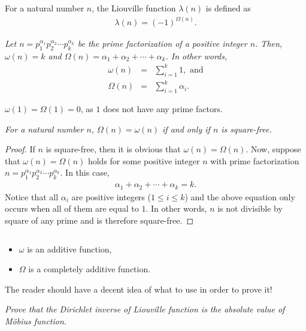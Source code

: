 \documentclass[12pt]{subfile}
\begin{document}
	\begin{definition}
		For a natural number $n$, the Liouville function $\lambda (n)$ is defined as
		\begin{align*}
			\lambda (n) =  (-1)^{\Omega(n)}.
		\end{align*}
	\end{definition}

		\begin{proposition}\slshape
			Let $n= p_1^{\alpha_1} p_2^{\alpha_2} \cdots p_k^{\alpha_k}$ be the prime factorization of a positive integer $n$. Then, $\omega(n)=k$ and $\Omega(n)=\alpha_1 + \alpha_2 + \cdots + \alpha_k$. In other words,
				\begin{eqnarray*}
					\omega(n) & = & \sum_{i=1}^{k} 1, \text{ and}\\
					\Omega(n) & = & \sum_{i=1}^{k} \alpha_i.
				\end{eqnarray*}
		\end{proposition}

		\begin{note}
			$\omega(1) = \Omega(1)=0$, as $1$ does not have any prime factors.
		\end{note}



		\begin{proposition}\slshape
			For a natural number $n$, $\Omega(n)=\omega(n)$ if and only if $n$ is square-free.
		\end{proposition}

		\begin{proof}
			If $n$ is square-free, then it is obvious that $\omega(n)=\Omega(n)$. Now, suppose that $\omega(n)=\Omega(n)$ holds for some positive integer $n$ with prime factorization $n= p_1^{\alpha_1} p_2^{\alpha_2} \cdots p_k^{\alpha_k}$. In this case,
				\begin{align*}
					\alpha_1 + \alpha_2 + \cdots + \alpha_k = k.
				\end{align*}
			Notice that all $\alpha_i$ are positive integers ($1 \leq i \leq k$) and the above equation only occurs when all of them are equal to $1$. In other words, $n$ is not divisible by square of any prime and is therefore square-free.
		\end{proof}

		\begin{proposition}\slshape\label{prop:additiveomega}
			$ $
			\begin{itemize}
				\item $\omega$ is an additive function,
				\item $\Omega$ is a completely additive function.
			\end{itemize}
		\end{proposition}
	The reader should have a decent idea of what to use in order to prove it!
		\begin{theorem}\slshape
			Prove that the Dirichlet inverse of Liouville function is the absolute value of M\"{o}bius function.
		\end{theorem}
\end{document}
